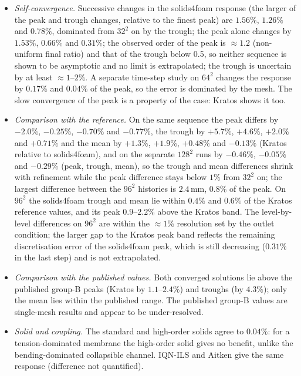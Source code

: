 \begin{itemize}
	\item \emph{Self-convergence.} Successive changes in the solids4foam response (the larger of the peak and trough changes, relative to the finest peak) are $1.56\%$, $1.26\%$ and $0.78\%$, dominated from $32^2$ on by the trough; the peak alone changes by $1.53\%$, $0.66\%$ and $0.31\%$; the observed order of the peak is $\approx1.2$ (non-uniform final ratio) and that of the trough below 0.5, so neither sequence is shown to be asymptotic and no limit is extrapolated; the trough is uncertain by at least $\approx1$--$2\%$. A separate time-step study on $64^2$ changes the response by $0.17\%$ and $0.04\%$ of the peak, so the error is dominated by the mesh. The slow convergence of the peak is a property of the case: Kratos shows it too.
	\item \emph{Comparison with the reference.} On the same sequence the peak differs by $-2.0\%$, $-0.25\%$, $-0.70\%$ and $-0.77\%$, the trough by $+5.7\%$, $+4.6\%$, $+2.0\%$ and $+0.71\%$ and the mean by $+1.3\%$, $+1.9\%$, $+0.48\%$ and $-0.13\%$ (Kratos relative to solids4foam), and on the separate $128^2$ runs by $-0.46\%$, $-0.05\%$ and $-0.29\%$ (peak, trough, mean), so the trough and mean differences shrink with refinement while the peak difference stays below $1\%$ from $32^2$ on; the largest difference between the $96^2$ histories is $2.4\,\mathrm{mm}$, $0.8\%$ of the peak. On $96^2$ the solids4foam trough and mean lie within $0.4\%$ and $0.6\%$ of the Kratos reference values, and its peak $0.9$--$2.2\%$ above the Kratos band. The level-by-level differences on $96^2$ are within the $\approx1\%$ resolution set by the outlet condition; the larger gap to the Kratos peak band reflects the remaining discretisation error of the solids4foam peak, which is still decreasing ($0.31\%$ in the last step) and is not extrapolated.
	\item \emph{Comparison with the published values.} Both converged solutions lie above the published group-B peaks (Kratos by $1.1$--$2.4\%$) and troughs (by $4.3\%$); only the mean lies within the published range. The published group-B values are single-mesh results and appear to be under-resolved.
	\item \emph{Solid and coupling.} The standard and high-order solids agree to $0.04\%$: for a tension-dominated membrane the high-order solid gives no benefit, unlike the bending-dominated collapsible channel. IQN-ILS and Aitken give the same response (difference not quantified).

\end{itemize}
